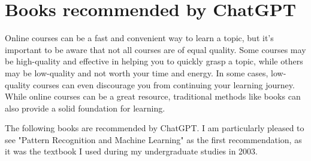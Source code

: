 \newpage
\section{Books recommended by ChatGPT}
Online courses can be a fast and convenient way to learn a topic, but it's important to be aware that not all courses are of equal quality. Some courses may be high-quality and effective in helping you to quickly grasp a topic, while others may be low-quality and not worth your time and energy. In some cases, low-quality courses can even discourage you from continuing your learning journey. While online courses can be a great resource, traditional methods like books can also provide a solid foundation for learning.

The following books are recommended by ChatGPT. I am particularly pleased to see "Pattern Recognition and Machine Learning" as the first recommendation, as it was the textbook I used during my undergraduate studies in 2003.


